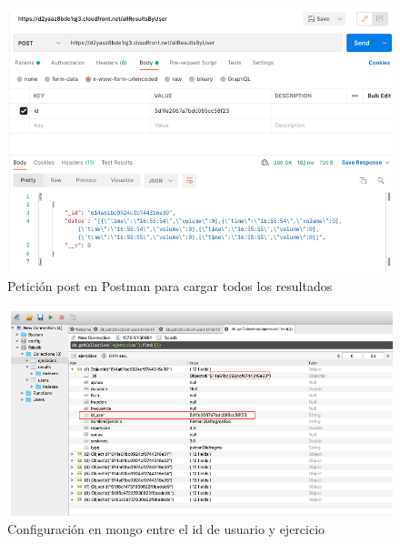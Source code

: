 \documentclass[12pt]{article}
\begin{document}
\begin{enumerate}
            
            \begin{figure}[ht]
            \centering
            \includegraphics[scale=0.35]{imag/allresultsbyuseronline.png}
            \caption{Petición post en Postman para cargar todos los resultados }
            \label{31}
            \end{figure}
            \FloatBarrier
            
            \begin{figure}[ht]
            \centering
            \includegraphics[scale=0.4]{imag/realcionmongoonline.png}
            \caption{Configuración en mongo entre el id de usuario y ejercicio }
            \label{32}
            \end{figure}
            \FloatBarrier
            
            
    
    
\end{enumerate}
\end{document}
